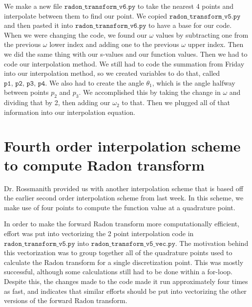 \documentclass[12pt]{article}
\begin{document}
We make a new file $\texttt{radon\_transform\_v6.py}$ to take the nearest 4 points and interpolate between them to find our point. We copied $\texttt{radon\_transform\_v5.py}$ and then pasted it into $\texttt{radon\_transform\_v6.py}$ to have a base for our code. \\
When we were changing the code, we found our $\omega$ values by subtracting one from the previous $\omega$ lower index and adding one to the previous $\omega$ upper index. Then we did the same thing with our s-values and our function values. Then we had to code our interpolation method. We still had to code the summation from Friday into our interpolation method, so we created variables to do that, called $\texttt{p1, p2, p3, p4}$. We also had to create the angle $\theta_1$, which is the angle halfway between points $p_2$ and $p_3$. We accomplished this by taking the change in $\omega$ and dividing that by 2, then adding our $\omega_2$ to that. Then we plugged all of that information into our interpolation equation.

\section*{Fourth order interpolation scheme to compute Radon transform}
Dr. Rossmanith provided us with another interpolation scheme that is based off the earlier second order interpolation scheme from last week.
In this scheme, we make use of four points to compute the function value at a quadrature point.

In order to make the forward Radon transform more computationally efficient, effort was put into vectorizing the 2 point interpolation code in $\texttt{radon\_transform\_v5.py}$ into $\texttt{radon\_transform\_v5\_vec.py}$.
The motivation behind this vectorization was to group together all of the quadrature points used to calculate the Radon transform for a single discretization point.
This was mostly successful, although some calculations still had to be done within a for-loop.
Despite this, the changes made to the code made it run approximately four times as fast, and indicates that similar efforts should be put into vectorizing the other versions of the forward Radon transform.
\end{document}
